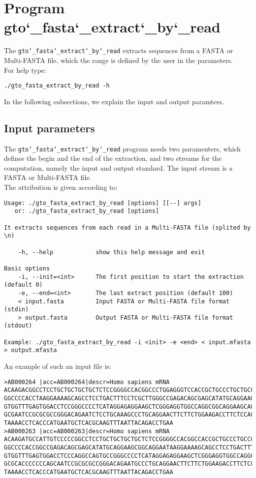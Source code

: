 \section{Program gto\char`_fasta\char`_extract\char`_by\char`_read}
The \texttt{gto\char`_fasta\char`_extract\char`_by\char`_read} extracts sequences from a FASTA or Multi-FASTA file, which the range is defined by the user in the parameters.\\
For help type:
\begin{lstlisting}
./gto_fasta_extract_by_read -h
\end{lstlisting}
In the following subsections, we explain the input and output paramters.

\subsection*{Input parameters}

The \texttt{gto\char`_fasta\char`_extract\char`_by\char`_read} program needs two paramenters, which defines the begin and the end of the extraction, and two streams for the computation, namely the input and output standard. The input stream is a FASTA or Multi-FASTA file.\\
The attribution is given according to:
\begin{lstlisting}
Usage: ./gto_fasta_extract_by_read [options] [[--] args]
   or: ./gto_fasta_extract_by_read [options]

It extracts sequences from each read in a Multi-FASTA file (splited by \n)

    -h, --help            show this help message and exit

Basic options
    -i, --init=<int>      The first position to start the extraction (default 0)
    -e, --end=<int>       The last extract position (default 100)
    < input.fasta         Input FASTA or Multi-FASTA file format (stdin)
    > output.fasta        Output FASTA or Multi-FASTA file format (stdout)

Example: ./gto_fasta_extract_by_read -i <init> -e <end> < input.mfasta > output.mfasta
\end{lstlisting}
An example of such an input file is:
\begin{lstlisting}
>AB000264 |acc=AB000264|descr=Homo sapiens mRNA 
ACAAGACGGCCTCCTGCTGCTGCTGCTCTCCGGGGCCACGGCCCTGGAGGGTCCACCGCTGCCCTGCTGCCATTGTCCCC
GGCCCCACCTAAGGAAAAGCAGCCTCCTGACTTTCCTCGCTTGGGCCGAGACAGCGAGCATATGCAGGAAGCGGCAGGAA
GTGGTTTGAGTGGACCTCCGGGCCCCTCATAGGAGAGGAAGCTCGGGAGGTGGCCAGGCGGCAGGAAGCAGGCCAGTGCC
GCGAATCCGCGCGCCGGGACAGAATCTCCTGCAAAGCCCTGCAGGAACTTCTTCTGGAAGACCTTCTCCACCCCCCCAGC
TAAAACCTCACCCATGAATGCTCACGCAAGTTTAATTACAGACCTGAA
>AB000263 |acc=AB000263|descr=Homo sapiens mRNA 
ACAAGATGCCATTGTCCCCCGGCCTCCTGCTGCTGCTGCTCTCCGGGGCCACGGCCACCGCTGCCCTGCCCCTGGAGGGT
GGCCCCACCGGCCGAGACAGCGAGCATATGCAGGAAGCGGCAGGAATAAGGAAAAGCAGCCTCCTGACTTTCCTCGCTTG
GTGGTTTGAGTGGACCTCCCAGGCCAGTGCCGGGCCCCTCATAGGAGAGGAAGCTCGGGAGGTGGCCAGGCGGCAGGAAG
GCGCACCCCCCCAGCAATCCGCGCGCCGGGACAGAATGCCCTGCAGGAACTTCTTCTGGAAGACCTTCTCCTCCTGCAAA
TAAAACCTCACCCATGAATGCTCACGCAAGTTTAATTACAGACCTGAA
\end{lstlisting}

